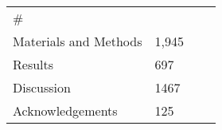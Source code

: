 \documentclass[
]{article}
\begin{document}
\begin{longtable}[]{@{}llll@{}}
\begin{minipage}[t]{0.15\columnwidth}
\#\strut
\end{minipage}\tabularnewline
\begin{minipage}[t]{0.35\columnwidth}\raggedright
Materials and Methods\strut
\end{minipage} & \begin{minipage}[t]{0.16\columnwidth}\raggedright
1,945\strut
\end{minipage} & \begin{minipage}[t]{0.22\columnwidth}\raggedright
\strut
\end{minipage} & \begin{minipage}[t]{0.15\columnwidth}\raggedright
\strut
\end{minipage}\tabularnewline
\begin{minipage}[t]{0.35\columnwidth}\raggedright
Results\strut
\end{minipage} & \begin{minipage}[t]{0.16\columnwidth}\raggedright
697\strut
\end{minipage} & \begin{minipage}[t]{0.22\columnwidth}\raggedright
\strut
\end{minipage} & \begin{minipage}[t]{0.15\columnwidth}\raggedright
\strut
\end{minipage}\tabularnewline
\begin{minipage}[t]{0.35\columnwidth}\raggedright
Discussion\strut
\end{minipage} & \begin{minipage}[t]{0.16\columnwidth}\raggedright
1467\strut
\end{minipage} & \begin{minipage}[t]{0.22\columnwidth}\raggedright
\strut
\end{minipage} & \begin{minipage}[t]{0.15\columnwidth}\raggedright
\strut
\end{minipage}\tabularnewline
\begin{minipage}[t]{0.35\columnwidth}\raggedright
Acknowledgements\strut
\end{minipage} & \begin{minipage}[t]{0.16\columnwidth}\raggedright
125\strut
\end{minipage} & \begin{minipage}[t]{0.22\columnwidth}\raggedright
\strut
\end{minipage} & \begin{minipage}[t]{0.15\columnwidth}\raggedright
\strut
\end{minipage}\tabularnewline
\bottomrule
\end{longtable}
\end{document}
